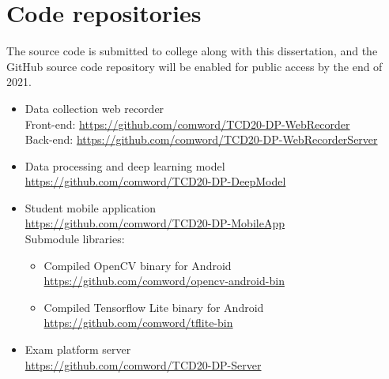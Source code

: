 \chapter{Code repositories}
The source code is submitted to college along with this dissertation, and the GitHub source code repository will be enabled for public access by the end of 2021.
\begin{itemize}
    \item Data collection web recorder \\
    Front-end: \url{https://github.com/comword/TCD20-DP-WebRecorder} \\
    Back-end: \url{https://github.com/comword/TCD20-DP-WebRecorderServer}
    \item Data processing and deep learning model \\ 
    \url{https://github.com/comword/TCD20-DP-DeepModel}
    \item Student mobile application \\
    \url{https://github.com/comword/TCD20-DP-MobileApp} \\
    Submodule libraries:
    \begin{itemize}
        \item Compiled OpenCV binary for Android \\
        \url{https://github.com/comword/opencv-android-bin}
        \item Compiled Tensorflow Lite binary for Android \\
        \url{https://github.com/comword/tflite-bin}
    \end{itemize}
    \item Exam platform server \\
    \url{https://github.com/comword/TCD20-DP-Server}
\end{itemize}